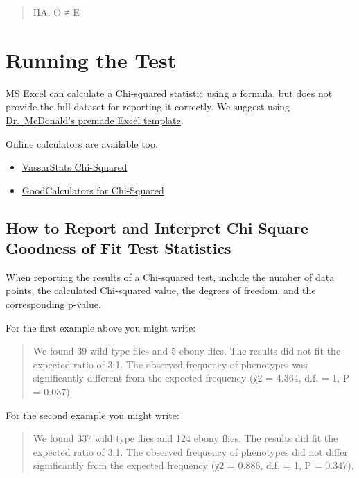 \documentclass[
]{book}
\providecommand{\tightlist}{%
  \setlength{\itemsep}{0pt}\setlength{\parskip}{0pt}}
\begin{document}
\begin{quote}
HA: O ≠ E
\end{quote}

\hypertarget{running-the-test}{%
\section{Running the Test}\label{running-the-test}}

MS Excel can calculate a Chi-squared statistic using a formula, but does not provide the full dataset for reporting it correctly. We suggest using \href{http://www.biostathandbook.com/chigof.xls}{Dr.~McDonald's premade Excel template}.

Online calculators are available too.

\begin{itemize}
\tightlist
\item
  \href{http://vassarstats.net/csfit.html}{VassarStats Chi-Squared}
\item
  \href{https://goodcalculators.com/chi-square-calculator/}{GoodCalculators for Chi-Squared}
\end{itemize}

\hypertarget{how-to-report-and-interpret-chi-square-goodness-of-fit-test-statistics}{%
\subsection{How to Report and Interpret Chi Square Goodness of Fit Test Statistics}\label{how-to-report-and-interpret-chi-square-goodness-of-fit-test-statistics}}

When reporting the results of a Chi-squared test, include the number of data points, the calculated Chi-squared value, the degrees of freedom, and the corresponding p-value.

For the first example above you might write:

\begin{quote}
We found 39 wild type flies and 5 ebony flies. The results did not fit the expected ratio of 3:1. The observed frequency of phenotypes was significantly different from the expected frequency (χ2 = 4.364, d.f. = 1, P = 0.037).
\end{quote}

For the second example you might write:

\begin{quote}
We found 337 wild type flies and 124 ebony flies. The results did fit the expected ratio of 3:1. The observed frequency of phenotypes did not differ significantly from the expected frequency (χ2 = 0.886, d.f. = 1, P = 0.347).
\end{quote}
\end{document}
